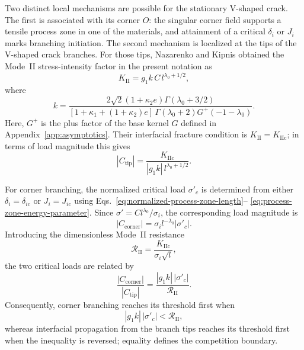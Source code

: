 \documentclass[pdflatex,onecolumn,sn-mathphys-ay]{sn-jnl}
\begin{document}
Two distinct local mechanisms are possible for the stationary V-shaped
crack. The first is associated with its corner $O$: the singular corner
field supports a tensile process zone in one of the materials, and
attainment of a critical $\delta_i$ or $J_i$ marks branching initiation.
The second mechanism is localized at the tips of the V-shaped crack branches.
For those tips, Nazarenko and Kipnis
\citeyearpar{NazarenkoKipnis2022Equilibrium} obtained the Mode~II
stress-intensity factor in the present notation as
\begin{equation}
\label{eq:branch-tip-KII}
  K_{\mathrm{II}}
  =g_1 k\,C\,l^{\lambda_0+1/2},
\end{equation}
where
\begin{equation*}
  k=
  \frac{
    2\sqrt{2}(1+\kappa_2e)\Gamma(\lambda_0+3/2)
  }{
    [1+\kappa_1+(1+\kappa_2)e]\,
    \Gamma(\lambda_0+2)G^+(-1-\lambda_0)
  }.
\end{equation*}
Here, $G^+$ is the plus factor of the base kernel $G$ defined in
Appendix~\ref{app:asymptotics}. Their interfacial fracture condition is
$K_{\mathrm{II}}=K_{\mathrm{IIc}}$; in terms of load magnitude this gives
\begin{equation*}
  |C_{\mathrm{tip}}|
  =
  \frac{K_{\mathrm{IIc}}}
  {|g_1k|\,l^{\lambda_0+1/2}}.
\end{equation*}

For corner branching, the normalized critical load
$\sigma'_c$ is determined from either
$\delta_i=\delta_{i\mathrm{c}}$ or
$J_i=J_{i\mathrm{c}}$ using
Eqs.~\eqref{eq:normalized-process-zone-length}--%
\eqref{eq:process-zone-energy-parameter}. Since
$\sigma'=Cl^{\lambda_0}/\sigma_i$, the corresponding load magnitude is
\begin{equation*}
  |C_{\mathrm{corner}}|
  =
  \sigma_i l^{-\lambda_0}|\sigma'_c|.
\end{equation*}
Introducing the dimensionless Mode~II resistance
\begin{equation*}
  \mathcal R_{\mathrm{II}}
  =
  \frac{K_{\mathrm{IIc}}}{\sigma_i\sqrt{l}},
\end{equation*}
the two critical loads are related by
\begin{equation}
\label{eq:mechanism-competition-ratio}
  \frac{|C_{\mathrm{corner}}|}{|C_{\mathrm{tip}}|}
  =
  \frac{|g_1k|\,|\sigma'_c|}{\mathcal R_{\mathrm{II}}}.
\end{equation}
Consequently, corner branching reaches its threshold first when
\begin{equation*}
  |g_1k|\,|\sigma'_c|<\mathcal R_{\mathrm{II}},
\end{equation*}
whereas interfacial propagation from the branch tips reaches its threshold
first when the inequality is reversed; equality defines the competition
boundary.
\end{document}

